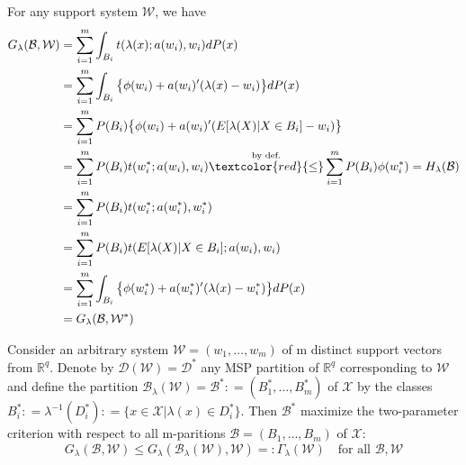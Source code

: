 \documentclass{article}
\begin{document}
\begin{tcolorbox}[coltitle= black!80, colframe=blue!35, colback=blue!10 ,title=\textbf{Proof of Theorem}]
For any support system $\mathcal W$, we have
\vspace{-2mm}
\begin{align}
	G_\lambda(\mathcal B, \mathcal W) & = \sum_{i=1}^m \int_{B_i} t(\lambda(x); a(w_i),w_i )dP(x) \\
	& = \sum_{i=1}^m \int_{B_i} \big\{ \phi(w_i) + a(w_i)'(\lambda(x) - w_i) \big\}dP(x)\\
	& = \sum_{i=1}^m P(B_i) \big\{ \phi(w_i) + a(w_i)'(E[\lambda(X)|X\in B_i] - w_i) \big\}\\
	& = \sum_{i=1}^m P(B_i) t(w_i^*; a(w_i), w_i) \overset{\text{by def.}}{\textcolor{red}{\le}} \sum_{i=1}^m P(B_i) \phi(w_i^*) = H_\lambda(\mathcal B)\\
	& = \sum_{i=1}^m P(B_i) t(w_i^*; a(w_i^*), w_i^*)\\
	& = \sum_{i=1}^m P(B_i) t(E[\lambda(X)|X\in B_i]; a(w_i), w_i)\\
	& = \sum_{i=1}^m \int_{B_i}\big\{ \phi(w_i^*) + a(w_i^*)'(\lambda(x) - w_i^*) \big\}dP(x) \\
	& = G_\lambda(\mathcal B, \mathcal W^*)
\end{align}

\end{tcolorbox}

\begin{tcolorbox}[coltitle= black!80, colframe=red!35, colback=red!10 ,title=\textbf{Theorem:  B(W) is the partition that maximize G(B,W)}]
Consider an arbitrary system $\mathcal W = (w_1, \ldots, w_m)$ of m distinct support vectors from $\mathbb R^q$. Denote by $\mathcal D(\mathcal W) = \mathcal D^*$ any MSP partition of $\mathbb R^q$ corresponding to $\mathcal W$ and define the partition $\mathcal B_\lambda(\mathcal W) = \mathcal B^* : = (B_1^* ,\ldots, B_m^*)$ of $\mathcal X$ by the classes $B_i^* : = \lambda^{-1}(D_i^*) : = \{ x\in \mathcal X | \lambda(x) \in D_i^* \}$. Then $\mathcal B^*$ maximize the two-parameter criterion with respect to all m-paritions $\mathcal B = (B_1,\ldots, B_m)$ of $\mathcal X$:
\vspace{-2mm}
\begin{equation}
	G_\lambda(\mathcal B, \mathcal W) \le G_\lambda(\mathcal B_\lambda(\mathcal W), \mathcal W) =: \Gamma_\lambda(\mathcal W) \quad \text{for all } \mathcal B, \mathcal W
\end{equation}

\end{tcolorbox}
\end{document}
